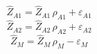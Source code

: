 \begin{dmath}
{{\hat{Z}_{A1}}}={{\hat{Z}_{A1}}}\, {{\rho_{A1}}}+{{\varepsilon_{A1}}}
\end{dmath}
\begin{dmath}
{{\hat{Z}_{A2}}}={{\hat{Z}_{A2}}}\, {{\rho_{A2}}}+{{\varepsilon_{A2}}}
\end{dmath}
\begin{dmath}
{{\hat{Z}_M}}={{\hat{Z}_M}}\, {{\rho_{M}}}-{{\varepsilon_{M}}}
\end{dmath}
